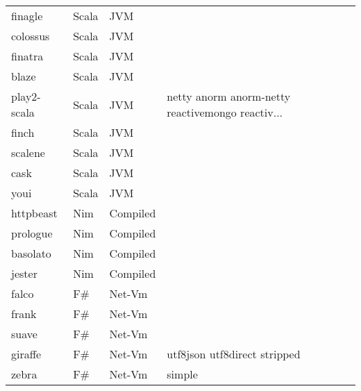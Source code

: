 \begin{longtable}{llll}
    finagle          & Scala       & JVM         &                                                    \\
    colossus         & Scala       & JVM         &                                                    \\
    finatra          & Scala       & JVM         &                                                    \\
    blaze            & Scala       & JVM         &                                                    \\
    play2-scala      & Scala       & JVM         & netty anorm anorm-netty reactivemongo reactiv...   \\
    finch            & Scala       & JVM         &                                                    \\
    scalene          & Scala       & JVM         &                                                    \\
    cask             & Scala       & JVM         &                                                    \\
    youi             & Scala       & JVM         &                                                    \\
    httpbeast        & Nim         & Compiled    &                                                    \\
    prologue         & Nim         & Compiled    &                                                    \\
    basolato         & Nim         & Compiled    &                                                    \\
    jester           & Nim         & Compiled    &                                                    \\
    falco            & F\#         & Net-Vm      &                                                    \\
    frank            & F\#         & Net-Vm      &                                                    \\
    suave            & F\#         & Net-Vm      &                                                    \\
    giraffe          & F\#         & Net-Vm      & utf8json utf8direct stripped                       \\
    zebra            & F\#         & Net-Vm      & simple                                             \\

\end{longtable}
